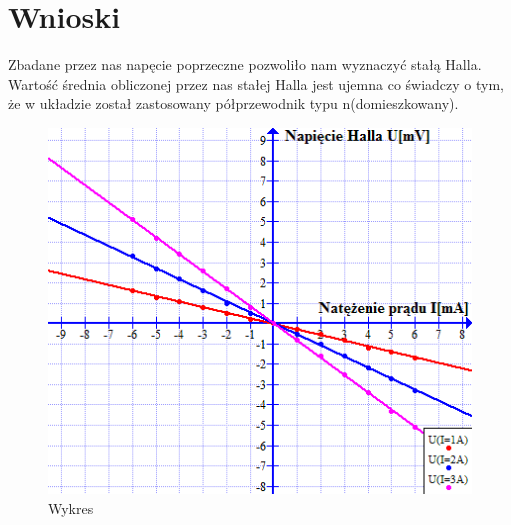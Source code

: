 \documentclass{article}
\begin{document}
\section{Wnioski}
Zbadane przez nas napęcie poprzeczne pozwoliło nam wyznaczyć stałą Halla. Wartość średnia obliczonej przez nas stałej Halla jest ujemna co świadczy o tym, że w układzie został zastosowany półprzewodnik typu n(domieszkowany).
\begin{figure}[ht]
\caption{Wykres}
\centering
\includegraphics{wykres_1.png}
\end{figure}\\
\end{document}
